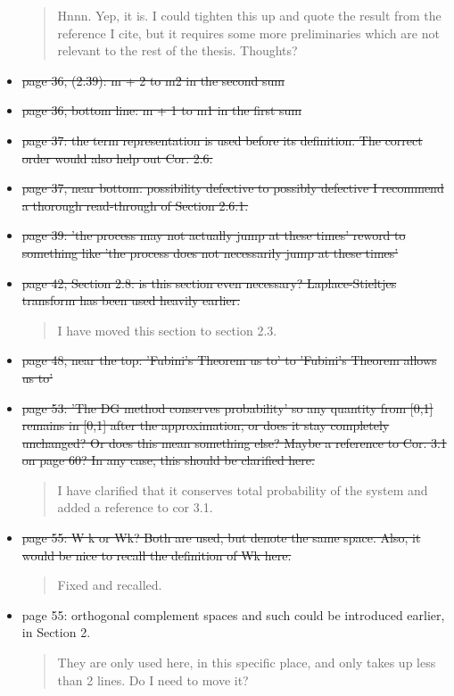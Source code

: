 \documentclass[a4paper]{article}
\begin{document}
\begin{itemize}
\begin{quote}
    Hnnn. Yep, it is. I could tighten this up and quote the result from the reference I cite, but it requires some more preliminaries which are not relevant to the rest of the thesis. Thoughts? 
\end{quote}
\item \st{page 36, (2.39): m + 2 to m2 in the second sum}
\item \st{page 36, bottom line: m + 1 to m1 in the first sum}
\item \st{page 37: the term representation is used before its definition. The correct order
would also help out Cor. 2.6.}
\item \st{page 37, near bottom: possibility defective to possibly defective I recommend a
thorough read-through of Section 2.6.1.}
\item \st{page 39: 'the process may not actually jump at these times' reword to something
like 'the process does not necessarily jump at these times'}
\item \st{page 42, Section 2.8: is this section even necessary? Laplace-Stieltjes transform has been used heavily earlier.}
\begin{quote}
    I have moved this section to section 2.3.
\end{quote}
\item \st{page 48, near the top: 'Fubini's Theorem us to' to 'Fubini's Theorem allows us to'}
\item \st{page 53: 'The DG method conserves probability' so any quantity from [0,1] remains
in [0,1] after the approximation, or does it stay completely unchanged? Or does this
mean something else? Maybe a reference to Cor. 3.1 on page 60? In any case, this
should be clarified here.}
\begin{quote}
    I have clarified that it conserves total probability of the system and added a reference to cor 3.1.
\end{quote}
\item \st{page 55: W k or Wk? Both are used, but denote the same space. Also, it would be
nice to recall the definition of Wk here.}
\begin{quote}
    Fixed and recalled.
\end{quote}
\item page 55: orthogonal complement spaces and such could be introduced earlier, in
Section 2.
\begin{quote}
    They are only used here, in this specific place, and only takes up less than 2 lines. Do I need to move it?

\end{quote}
\end{itemize}
\end{document}
